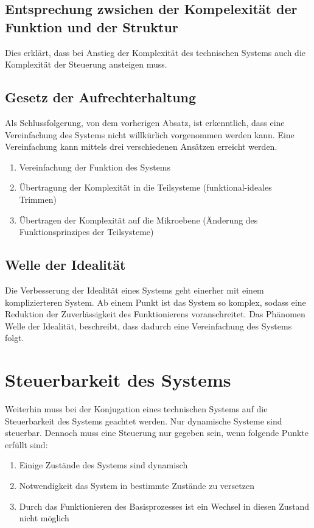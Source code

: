 \documentclass[DIV=22, 10pt, a4paper]{scrartcl}
\begin{document}
    \subsection{Entsprechung zwsichen der Kompelexität der Funktion und der Struktur}
    Dies erklärt, dass bei Anstieg der Komplexität des technischen Systems auch die Komplexität der Steuerung ansteigen muss.

    \subsection{Gesetz der Aufrechterhaltung}
    Als Schlussfolgerung, von dem vorherigen Absatz, ist erkenntlich, dass eine Vereinfachung des Systems nicht willkürlich vorgenommen werden kann.
    Eine Vereinfachung kann mittels drei verschiedenen Ansätzen erreicht werden.

    \begin{enumerate}
        \item Vereinfachung der Funktion des Systems
        \item Übertragung der Komplexität in die Teilsysteme (funktional-ideales Trimmen)
        \item Übertragen der Komplexität auf die Mikroebene (Änderung des Funktionsprinzipes der Teilsysteme)
    \end{enumerate}

    \subsection{Welle der Idealität}
    Die Verbesserung der Idealität eines Systems geht einerher mit einem komplizierteren System.
    Ab einem Punkt ist das System so komplex, sodass eine Reduktion der Zuverlässigkeit des Funktionierens voranschreitet.
    Das Phänomen \glqq Welle der Idealität\grqq{}, beschreibt, dass dadurch eine Vereinfachung des Systems folgt.

    \section{Steuerbarkeit des Systems}
    Weiterhin muss bei der Konjugation eines technischen Systems auf die Steuerbarkeit des Systems geachtet werden.
    Nur dynamische Systeme sind steuerbar.
    Dennoch muss eine Steuerung nur gegeben sein, wenn folgende Punkte erfüllt sind:

    \begin{enumerate}
        \item Einige Zustände des Systems sind dynamisch
        \item Notwendigkeit das System in bestimmte Zustände zu versetzen
        \item Durch das Funktionieren des Basisprozesses ist ein Wechsel in diesen Zustand nicht möglich
    \end{enumerate}
\end{document}
